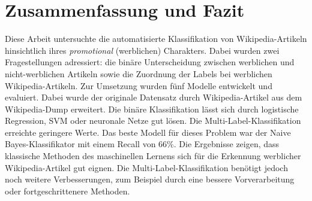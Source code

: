 \section{Zusammenfassung und Fazit}
\label{ZusammenfassungUndFazit}
Diese Arbeit untersuchte die automatisierte Klassifikation von Wikipedia-Artikeln hinsichtlich ihres \textit{promotional} (werblichen) Charakters. Dabei wurden zwei Fragestellungen adressiert: die binäre Unterscheidung zwischen werblichen und nicht-werblichen Artikeln sowie die Zuordnung der Labels bei werblichen Wikipedia-Artikeln. Zur Umsetzung wurden fünf Modelle entwickelt und evaluiert. Dabei wurde der originale Datensatz durch Wikipedia-Artikel aus dem Wikipedia-Dump erweitert. Die binäre Klassifikation lässt sich durch logistische Regression, SVM oder neuronale Netze gut lösen. Die Multi-Label-Klassifikation erreichte geringere Werte. Das beste Modell für dieses Problem war der Naive Bayes-Klassifikator mit einem Recall von 66\%. Die Ergebnisse zeigen, dass klassische Methoden des maschinellen Lernens sich für die Erkennung werblicher Wikipedia-Artikel gut eignen. Die Multi-Label-Klassifikation benötigt jedoch noch weitere Verbesserungen, zum Beispiel durch eine bessere Vorverarbeitung oder fortgeschrittenere Methoden.
